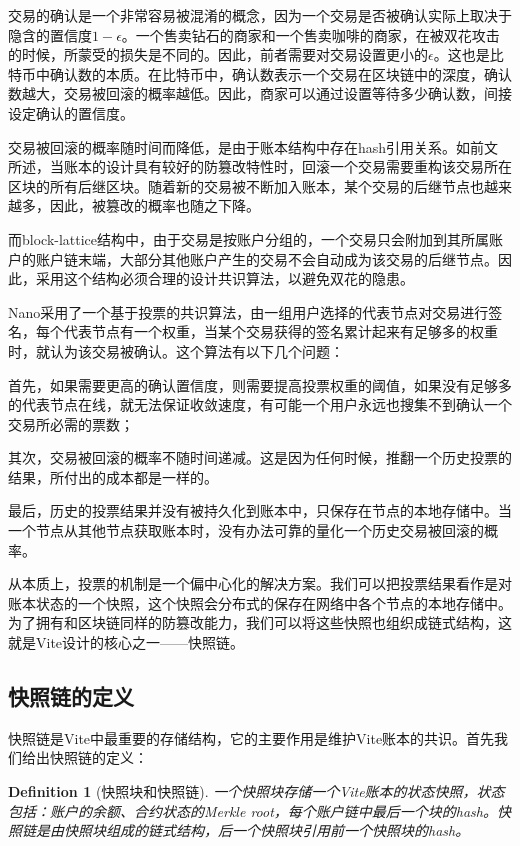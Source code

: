 \documentclass[UTF8,nofonts]{ctexart}
\newtheorem{definition}{Definition}[section]
\begin{document}
\begin{multicols}{2}
交易的确认是一个非常容易被混淆的概念，因为一个交易是否被确认实际上取决于隐含的置信度$1-\epsilon$。一个售卖钻石的商家和一个售卖咖啡的商家，在被双花攻击的时候，所蒙受的损失是不同的。因此，前者需要对交易设置更小的$\epsilon$。这也是比特币中确认数的本质。在比特币中，确认数表示一个交易在区块链中的深度，确认数越大，交易被回滚的概率越低\cite{nakamoto2008bitcoin}。因此，商家可以通过设置等待多少确认数，间接设定确认的置信度。

交易被回滚的概率随时间而降低，是由于账本结构中存在hash引用关系。如前文所述，当账本的设计具有较好的防篡改特性时，回滚一个交易需要重构该交易所在区块的所有后继区块。随着新的交易被不断加入账本，某个交易的后继节点也越来越多，因此，被篡改的概率也随之下降。

而block-lattice结构中，由于交易是按账户分组的，一个交易只会附加到其所属账户的账户链末端，大部分其他账户产生的交易不会自动成为该交易的后继节点。因此，采用这个结构必须合理的设计共识算法，以避免双花的隐患。

Nano采用了一个基于投票的共识算法\cite{nano}，由一组用户选择的代表节点对交易进行签名，每个代表节点有一个权重，当某个交易获得的签名累计起来有足够多的权重时，就认为该交易被确认。这个算法有以下几个问题：

首先，如果需要更高的确认置信度，则需要提高投票权重的阈值，如果没有足够多的代表节点在线，就无法保证收敛速度，有可能一个用户永远也搜集不到确认一个交易所必需的票数；

其次，交易被回滚的概率不随时间递减。这是因为任何时候，推翻一个历史投票的结果，所付出的成本都是一样的。

最后，历史的投票结果并没有被持久化到账本中，只保存在节点的本地存储中。当一个节点从其他节点获取账本时，没有办法可靠的量化一个历史交易被回滚的概率。

从本质上，投票的机制是一个偏中心化的解决方案。我们可以把投票结果看作是对账本状态的一个快照，这个快照会分布式的保存在网络中各个节点的本地存储中。为了拥有和区块链同样的防篡改能力，我们可以将这些快照也组织成链式结构，这就是Vite设计的核心之一——快照链\cite{snapshotchain}。

\subsection{快照链的定义}
快照链是Vite中最重要的存储结构，它的主要作用是维护Vite账本的共识。首先我们给出快照链的定义：
\begin{definition}[快照块和快照链]
一个快照块存储一个Vite账本的状态快照，状态包括：账户的余额、合约状态的Merkle root，每个账户链中最后一个块的hash。快照链是由快照块组成的链式结构，后一个快照块引用前一个快照块的hash。
\end{definition}


\end{multicols}
\end{document}

